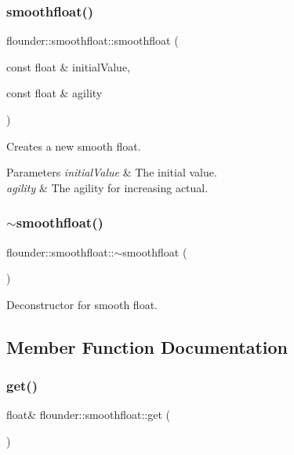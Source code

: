 \subsubsection{\texorpdfstring{smoothfloat()}{smoothfloat()}}
{\footnotesize\ttfamily flounder\+::smoothfloat\+::smoothfloat (\begin{DoxyParamCaption}\item[{const float \&}]{initial\+Value,  }\item[{const float \&}]{agility }\end{DoxyParamCaption})}



Creates a new smooth float. 


\begin{DoxyParams}{Parameters}
{\em initial\+Value} & The initial value. \\
\hline
{\em agility} & The agility for increasing actual. \\
\hline
\end{DoxyParams}
\mbox{\label{classflounder_1_1smoothfloat_a4d96e3fdb93fbbf9d28c788a1b7a4e58}} 
\subsubsection{\texorpdfstring{$\sim$smoothfloat()}{~smoothfloat()}}
{\footnotesize\ttfamily flounder\+::smoothfloat\+::$\sim$smoothfloat (\begin{DoxyParamCaption}{ }\end{DoxyParamCaption})}



Deconstructor for smooth float. 



\subsection{Member Function Documentation}
\mbox{\label{classflounder_1_1smoothfloat_a3c69b87e7702a644c3d5f1cca646206e}} 
\subsubsection{\texorpdfstring{get()}{get()}}
{\footnotesize\ttfamily float\& flounder\+::smoothfloat\+::get (\begin{DoxyParamCaption}{ }\end{DoxyParamCaption})\hspace{0.3cm}{\ttfamily [inline]}}



